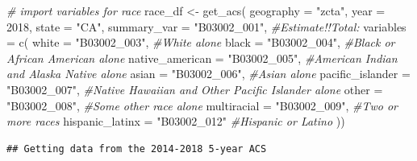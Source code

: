 \documentclass[
]{book}
\newenvironment{Shaded}{\begin{snugshade}}{\end{snugshade}}
\newcommand{\AttributeTok}[1]{\textcolor[rgb]{0.77,0.63,0.00}{#1}}
\newcommand{\CommentTok}[1]{\textcolor[rgb]{0.56,0.35,0.01}{\textit{#1}}}
\newcommand{\DecValTok}[1]{\textcolor[rgb]{0.00,0.00,0.81}{#1}}
\newcommand{\FunctionTok}[1]{\textcolor[rgb]{0.00,0.00,0.00}{#1}}
\newcommand{\NormalTok}[1]{#1}
\newcommand{\OtherTok}[1]{\textcolor[rgb]{0.56,0.35,0.01}{#1}}
\newcommand{\StringTok}[1]{\textcolor[rgb]{0.31,0.60,0.02}{#1}}
\begin{document}
\begin{Shaded}
\begin{Highlighting}[]
\CommentTok{\# import variables for race}
\NormalTok{race\_df }\OtherTok{\textless{}{-}} 
  \FunctionTok{get\_acs}\NormalTok{(}
    \AttributeTok{geography =} \StringTok{"zcta"}\NormalTok{, }\AttributeTok{year =} \DecValTok{2018}\NormalTok{,}
    \AttributeTok{state =} \StringTok{"CA"}\NormalTok{,}
    \AttributeTok{summary\_var =} \StringTok{"B03002\_001"}\NormalTok{, }\CommentTok{\#Estimate!!Total: }
    \AttributeTok{variables =} \FunctionTok{c}\NormalTok{(}
      \AttributeTok{white =} \StringTok{"B03002\_003"}\NormalTok{, }\CommentTok{\#White alone}
      \AttributeTok{black =} \StringTok{"B03002\_004"}\NormalTok{, }\CommentTok{\#Black or African American alone}
      \AttributeTok{native\_american =} \StringTok{"B03002\_005"}\NormalTok{, }\CommentTok{\#American Indian and Alaska Native alone}
      \AttributeTok{asian =} \StringTok{"B03002\_006"}\NormalTok{, }\CommentTok{\#Asian alone}
      \AttributeTok{pacific\_islander =} \StringTok{"B03002\_007"}\NormalTok{, }\CommentTok{\#Native Hawaiian and Other Pacific Islander alone}
      \AttributeTok{other =} \StringTok{"B03002\_008"}\NormalTok{, }\CommentTok{\#Some other race alone}
      \AttributeTok{multiracial =} \StringTok{"B03002\_009"}\NormalTok{, }\CommentTok{\#Two or more races}
      \AttributeTok{hispanic\_latinx =} \StringTok{"B03002\_012"} \CommentTok{\#Hispanic or Latino}
\NormalTok{    ))}
\end{Highlighting}
\end{Shaded}

\begin{verbatim}
## Getting data from the 2014-2018 5-year ACS
\end{verbatim}
\end{document}
